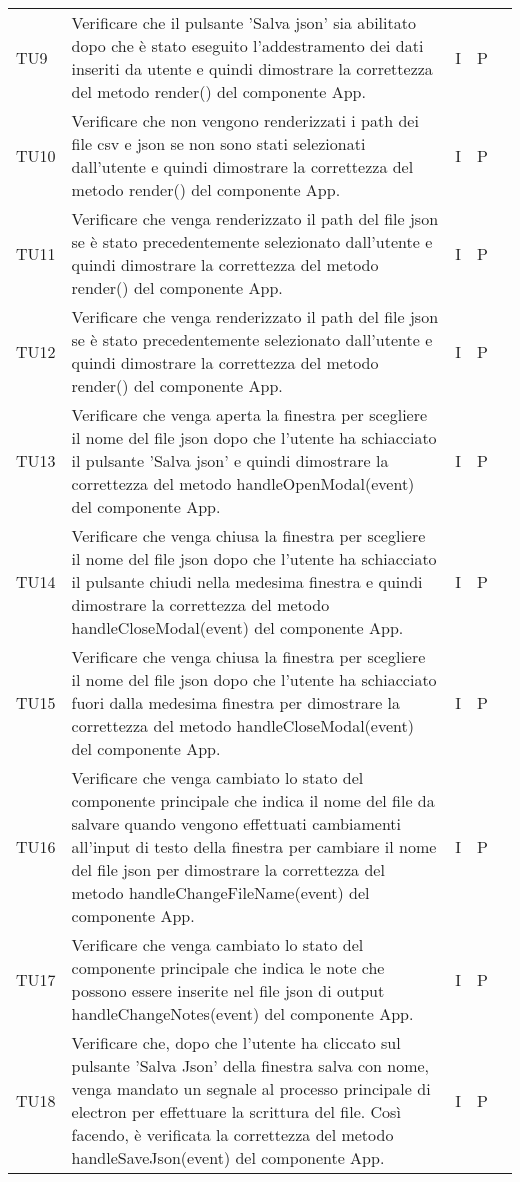 \begin{longtable} {
		>{}p{15mm} 
		>{}p{79.5mm}
		>{}p{15mm} 
		>{}p{15mm}
		>{}p{0mm}}
	TU9		& Verificare che il pulsante 'Salva json' sia abilitato dopo che è stato eseguito l'addestramento dei dati inseriti da utente e quindi dimostrare la correttezza del metodo render() del componente App. & I & P &\TBstrut \\ [2mm]
	TU10	& Verificare che non vengono renderizzati i path dei file csv e json se non sono stati selezionati dall'utente e quindi dimostrare la correttezza del metodo render() del componente App. & I & P &\TBstrut \\ [2mm]
	TU11	& Verificare che venga renderizzato il path del file json se è stato precedentemente selezionato dall'utente e quindi dimostrare la correttezza del metodo render() del componente App. & I & P &\TBstrut \\ [2mm]
	TU12	& Verificare che venga renderizzato il path del file json se è stato precedentemente selezionato dall'utente e quindi dimostrare la correttezza del metodo render() del componente App. & I & P &\TBstrut \\ [2mm]
	TU13	& Verificare che venga aperta la finestra per scegliere il nome del file json dopo che l'utente ha schiacciato il pulsante 'Salva json' e quindi dimostrare la correttezza del metodo handleOpenModal(event) del componente App. & I & P &\TBstrut \\ [2mm]
	TU14	& Verificare che venga chiusa la finestra per scegliere il nome del file json dopo che l'utente ha schiacciato il pulsante chiudi nella medesima finestra e quindi dimostrare la correttezza del metodo handleCloseModal(event) del componente App. & I & P &\TBstrut \\ [2mm]
	TU15	& Verificare che venga chiusa la finestra per scegliere il nome del file json dopo che l'utente ha schiacciato fuori dalla medesima finestra per dimostrare la correttezza del metodo handleCloseModal(event) del componente App. & I & P &\TBstrut \\ [2mm]
	TU16	& Verificare che venga cambiato lo stato del componente principale che indica il nome del file da salvare quando vengono effettuati cambiamenti all'input di testo della finestra per cambiare il nome del file json per dimostrare la correttezza del metodo handleChangeFileName(event) del componente App. & I & P &\TBstrut \\ [2mm]
	TU17	& Verificare che venga cambiato lo stato del componente principale che indica le note che possono essere inserite nel file json di output handleChangeNotes(event) del componente App. & I & P &\TBstrut \\ [2mm]
	TU18	& Verificare che, dopo che l'utente ha cliccato sul pulsante 'Salva Json' della finestra salva con nome, venga mandato un segnale al processo principale di electron per effettuare la scrittura del file. Così facendo, è verificata la correttezza del metodo handleSaveJson(event) del componente App. & I & P &\TBstrut \\ [2mm]

\end{longtable}
